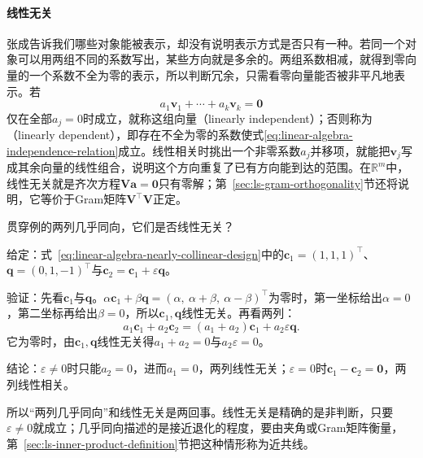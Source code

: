 \paragraph{线性无关}
\label{sec:ls-linear-dependence}
张成告诉我们哪些对象能被表示，却没有说明表示方式是否只有一种。若同一个对象可以用两组不同的系数写出，某些方向就是多余的。两组系数相减，就得到零向量的一个系数不全为零的表示，所以判断冗余，只需看零向量能否被非平凡地表示。若
\begin{equation}
 a_1\bm v_1+\cdots+a_k\bm v_k=\bm0
 \label{eq:linear-algebra-independence-relation}
\end{equation}
仅在全部$a_j=0$时成立，就称这组向量（linearly independent）；否则称为（linearly dependent），即存在不全为零的系数使式\eqref{eq:linear-algebra-independence-relation}成立。线性相关时挑出一个非零系数$a_j$并移项，就能把$\bm v_j$写成其余向量的线性组合，说明这个方向重复了已有方向能到达的范围。在$\mathbb R^m$中，线性无关就是齐次方程$\bm V\bm a=\bm0$只有零解；第~\ref{sec:ls-gram-orthogonality}节还将说明，它等价于Gram矩阵$\bm V^\top\bm V$正定。

贯穿例的两列几乎同向，它们是否线性无关？
\begin{example}[近共线的两列仍线性无关]
\label{ex:ls-nearly-collinear-independence}
给定：式~\eqref{eq:linear-algebra-nearly-collinear-design}中的$\bm c_1=(1,1,1)^\top$、$\bm q=(0,1,-1)^\top$与$\bm c_2=\bm c_1+\varepsilon\bm q$。

验证：先看$\bm c_1$与$\bm q$。$\alpha\bm c_1+\beta\bm q=(\alpha,\ \alpha+\beta,\ \alpha-\beta)^\top$为零时，第一坐标给出$\alpha=0$，第二坐标再给出$\beta=0$，所以$\bm c_1,\bm q$线性无关。再看两列：
\[
 a_1\bm c_1+a_2\bm c_2=(a_1+a_2)\bm c_1+a_2\varepsilon\bm q .
\]
它为零时，由$\bm c_1,\bm q$线性无关得$a_1+a_2=0$与$a_2\varepsilon=0$。

结论：$\varepsilon\neq0$时只能$a_2=0$，进而$a_1=0$，两列线性无关；$\varepsilon=0$时$\bm c_1-\bm c_2=\bm0$，两列线性相关。
\end{example}
所以“两列几乎同向”和线性无关是两回事。线性无关是精确的是非判断，只要$\varepsilon\neq0$就成立；几乎同向描述的是接近退化的程度，要由夹角或Gram矩阵衡量，第~\ref{sec:ls-inner-product-definition}节把这种情形称为近共线。

